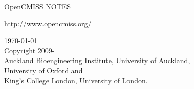 \thispagestyle{empty}

\begin{center}
   \huge OpenCMISS NOTES
   \vspace{10mm}   

   \large \url{http://www.opencmiss.org/}
   \vspace{10mm}   

   \begin{figure}[htbp] \centering
   \end{figure} %
   \vspace{10mm}   

   \vspace{5mm}
   \today\\   %
   \vspace{20mm}
   \small
   \textcopyright \thickspace Copyright 2009-\\
   Auckland Bioengineering Institute, University of Auckland, \\
   University of Oxford and \\
   King's College London, University of London.
\end{center}





